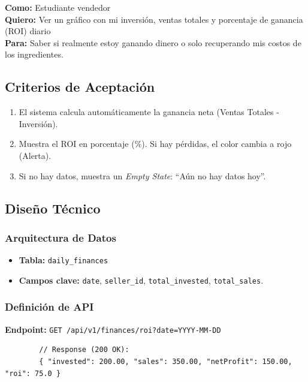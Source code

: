 \documentclass[11pt, letterpaper]{article}
\begin{document}
    \begin{tcolorbox}[colback=blue!5!white,colframe=blue!75!black,title=HU-02: Cálculo de Rentabilidad]
        \textbf{Como:} Estudiante vendedor \\
        \textbf{Quiero:} Ver un gráfico con mi inversión, ventas totales y porcentaje de ganancia (ROI) diario \\
        \textbf{Para:} Saber si realmente estoy ganando dinero o solo recuperando mis costos de los ingredientes.
    \end{tcolorbox}

    \subsection{Criterios de Aceptación}
    \begin{enumerate}[label=\bfseries\arabic*.]
        \item El sistema calcula automáticamente la ganancia neta (Ventas Totales - Inversión).
        \item Muestra el ROI en porcentaje (\%). Si hay pérdidas, el color cambia a rojo (Alerta).
        \item Si no hay datos, muestra un \textit{Empty State}: ``Aún no hay datos hoy''.
    \end{enumerate}

    \subsection{Diseño Técnico}
    \subsubsection*{Arquitectura de Datos}
    \begin{itemize}
        \item \textbf{Tabla:} \texttt{daily\_finances}
        \item \textbf{Campos clave:} \texttt{date}, \texttt{seller\_id}, \texttt{total\_invested}, \texttt{total\_sales}.
    \end{itemize}

    \subsubsection*{Definición de API}
    \textbf{Endpoint:} \texttt{GET /api/v1/finances/roi?date=YYYY-MM-DD}
    \begin{verbatim}
        // Response (200 OK):
        { "invested": 200.00, "sales": 350.00, "netProfit": 150.00, "roi": 75.0 }
    \end{verbatim}
\end{document}
